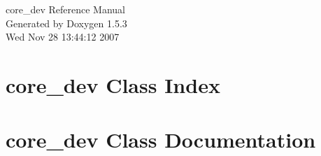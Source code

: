 \documentclass[a4paper]{book}
\begin{document}
\begin{titlepage}
\vspace*{7cm}
\begin{center}
{\Large core\_\-dev Reference Manual}\\
\vspace*{1cm}
{\large Generated by Doxygen 1.5.3}\\
\vspace*{0.5cm}
{\small Wed Nov 28 13:44:12 2007}\\
\end{center}
\end{titlepage}
\clearemptydoublepage
{}
\tableofcontents
\clearemptydoublepage
{}
\chapter{core\_\-dev Class Index}

\chapter{core\_\-dev Class Documentation}






\printindex
\end{document}

